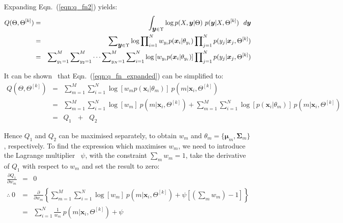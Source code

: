 \documentclass[10pt,a4paper]{article}
\def\Vec#1{{\boldsymbol{#1}}}
\def\Mat#1{{\boldsymbol{#1}}}
\begin{document}
\noindent
Expanding Eqn.~(\ref{eqn:q_fn2}) yields:
%
\begin{eqnarray}
	Q(\Theta, \Theta^{[k]}) & = & \int_{\mbox{\boldmath $y$} \in \Upsilon}
									\log p(X,\mbox{\boldmath $y$} | \Theta) ~ p(\mbox{\boldmath $y$}|X,\Theta^{[k]}) ~~ d \mbox{\boldmath $y$} \\
							~ & = & \sum\nolimits_{\mbox{\boldmath $y$} \in \Upsilon}  \log \prod\nolimits_{i=1}^{N} w_{y_i} p(\Vec{x}_i | \theta_{y_i})  
																		\prod\nolimits_{j=1}^{N} p(y_j | \Vec{x}_j, \Theta^{[k]} ) \\
							~ & = & \sum\nolimits_{y_1=1}^{M} \sum\nolimits_{y_2=1}^{M} \cdots \sum\nolimits_{y_N=1}^{M} 
															\sum\nolimits_{i=1}^{N} \log \left[ w_{y_i} p(\Vec{x}_i | \theta_{y_i}) \right] 
															\prod\nolimits_{j=1}^{N} p(y_j | \Vec{x}_j, \Theta^{[k]} )  \label{eqn:q_fn_expanded}
\end{eqnarray}%

\noindent
It can be shown~\cite{Bilmes98} that Eqn.~(\ref{eqn:q_fn_expanded}) can be simplified to:
%
\begin{eqnarray}
	Q(\Theta, \Theta^{[k]}) & = & \sum\nolimits_{m=1}^{M}  \sum\nolimits_{i=1}^{N} \log[ w_m  p(\Vec{x}_i | \theta_m)] ~ p(m|\Vec{x}_i, \Theta^{[k]}) \\
							~ & = & \sum\nolimits_{m=1}^{M}  \sum\nolimits_{i=1}^{N} \log[ w_m ] ~  p(m|\Vec{x}_i, \Theta^{[k]}) +
									\sum\nolimits_{m=1}^{M}	\sum\nolimits_{i=1}^{N} \log[  p(\Vec{x}_i | \theta_m) ] ~ p(m|\Vec{x}_i, \Theta^{[k]}) ~~~ \\
							~ & = & Q_1 ~~~ + ~~~ Q_2 
\end{eqnarray}%

\noindent
Hence $Q_1$ and $Q_2$ can be maximised separately, to obtain $w_m$ and $\theta_m = \{ \Vec{\mu}_m, \Mat{\Sigma}_m \}$, respectively.
To find the expression which maximises $w_m$, we need to introduce the Lagrange multiplier~\cite{Duda01} $\psi$,
with the constraint $\sum\nolimits_m w_m = 1$, take the derivative of $Q_1$ with respect to $w_m$ and set the result to zero:
%
\begin{eqnarray}
	\frac{\partial Q_1}{\partial w_m} & = & 0 \\
						\therefore ~ 0  & = & \frac{\partial}{\partial w_m}
											\left\{ \sum\nolimits_{m=1}^{M} \sum\nolimits_{i=1}^{N} \log[ w_m ]  ~ p(m|\Vec{x}_i, \Theta^{[k]})
											 		+ \psi \left[ (\sum\nolimits_m w_m) -1 \right] \right\} \\
									~ & = & \sum\nolimits_{i=1}^{N} \frac{1}{w_m} ~ p(m|\Vec{x}_i, \Theta^{[k]}) + \psi \label{eqn:q1_alpha_opt}
\end{eqnarray}
\end{document}
